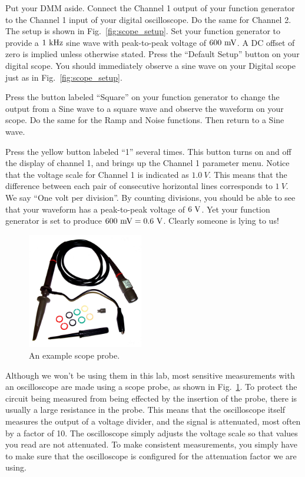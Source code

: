 Put your DMM aside.  Connect the Channel 1 output of your function
generator to the Channel 1 input of your digital oscilloscope.  Do the
same for Channel 2.  The setup is shown in Fig.~\ref{fig:scope_setup}.
Set your function generator to provide a $1~\rm kHz$ sine wave with
peak-to-peak voltage of $600~\rm mV$.  A DC offset of zero is implied
unless otherwise stated. Press the ``Default Setup'' button on your
digital scope.  You should immediately observe a sine wave on your
Digital scope just as in Fig.~\ref{fig:scope_setup}.

Press the button labeled ``Square'' on your function generator to
change the output from a Sine wave to a square wave and observe the
waveform on your scope.  Do the same for the Ramp and
Noise functions.  Then return to a Sine wave.

Press the yellow button labeled ``1'' several times.  This button
turns on and off the display of channel 1, and brings up the Channel 1
parameter menu.  Notice that the voltage scale for Channel 1 is
indicated as $1.0~V$.  This means that the difference between each
pair of consecutive horizontal lines corresponds to $1~V$.  We say
``One volt per division''.  By counting divisions, you should be able
to see that your waveform has a peak-to-peak voltage of $6~\rm V$.
Yet your function generator is set to produce $600~\rm mV = 0.6~\rm
V$.  Clearly someone is lying to us!

\begin{figure}[htbp]
\begin{center}
\includegraphics[width=0.45\textwidth]{figs/labs/lissajous/probe.jpg} 
\caption{An example scope probe.}
\label{fig:probe}
\end{center}
\end{figure}

Although we won't be using them in this lab, most sensitive
measurements with an oscilloscope are made using a scope probe, as
shown in Fig.~\ref{fig:probe}.  To protect the circuit being measured
from being effected by the insertion of the probe, there is usually a
large resistance in the probe.  This means that the oscilloscope
itself measures the output of a voltage divider, and the signal is
attenuated, most often by a factor of 10.  The oscilloscope simply
adjusts the voltage scale so that values you read are not attenuated.
To make consistent measurements, you simply have to make sure that the
oscilloscope is configured for the attenuation factor we are using.


